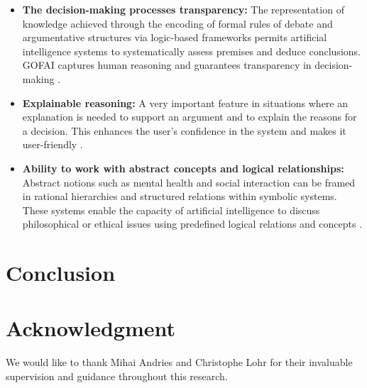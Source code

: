 \documentclass[conference]{IEEEtran}
\begin{document}
\begin{itemize}
    \item \textbf{The decision-making processes transparency:} The representation of knowledge achieved through the encoding of formal rules of debate and argumentative structures via logic-based frameworks permits artificial intelligence systems to systematically assess premises and deduce conclusions. GOFAI captures human reasoning and guarantees transparency in decision-making \cite{b8}.
    \item \textbf{Explainable reasoning:} A very important feature in situations where an explanation is needed to support an argument and to explain the reasons for a decision. This enhances the user's confidence in the system and makes it user-friendly \cite{b9}.
    \item \textbf{Ability to work with abstract concepts and logical relationships:} Abstract notions such as mental health and social interaction can be framed in rational hierarchies and structured relations within symbolic systems. These systems enable the capacity of artificial intelligence to discuss philosophical or ethical issues using predefined logical relations and concepts \cite{b8}.
\end{itemize}

\section{Conclusion}

\section*{Acknowledgment}
We would like to thank Mihai Andries and Christophe Lohr for their invaluable supervision and guidance throughout this research.
\end{document}
